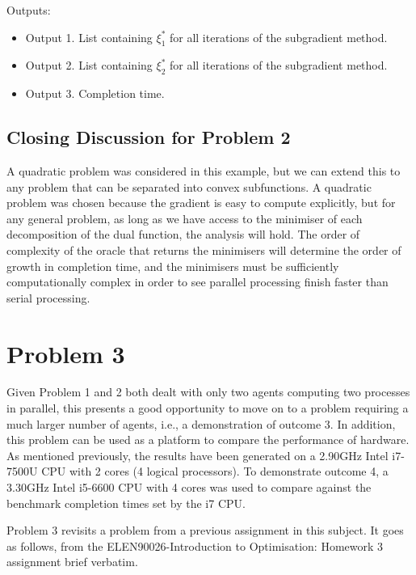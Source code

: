 \documentclass[12pt]{article}
\begin{document}
Outputs:
\begin{itemize}
	\item Output 1. List containing $\xi_1^*$ for all iterations of the subgradient method.
	\item Output 2. List containing $\xi_2^*$ for all iterations of the subgradient method.
	\item Output 3. Completion time.
\end{itemize}

\subsection*{Closing Discussion for Problem 2}

A quadratic problem was considered in this example, but we can extend this to any problem that can be separated into convex subfunctions. A quadratic problem was chosen because the gradient is easy to compute explicitly, but for any general problem, as long as we have access to the minimiser of each decomposition of the dual function, the analysis will hold. The order of complexity of the oracle that returns the minimisers will determine the order of growth in completion time, and the minimisers must be sufficiently computationally complex in order to see parallel processing finish faster than serial processing.

\section*{Problem 3}

Given Problem 1 and 2 both dealt with only two agents computing two processes in parallel, this presents a good opportunity to move on to a problem requiring a much larger number of agents, i.e., a demonstration of outcome 3. In addition, this problem can be used as a platform to compare the performance of hardware. As mentioned previously, the results have been generated on a 2.90GHz Intel i7-7500U CPU with 2 cores (4 logical processors). To demonstrate outcome 4, a 3.30GHz Intel i5-6600 CPU with 4 cores was used to compare against the benchmark completion times set by the i7 CPU.

Problem 3 revisits a problem from a previous assignment in this subject. It goes as follows, from the ELEN90026-Introduction to Optimisation: Homework 3 assignment brief verbatim.
\end{document}

